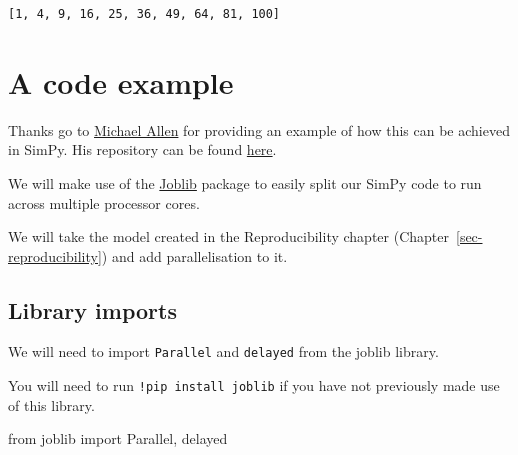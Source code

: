 \documentclass[
  letterpaper,
  DIV=11,
  numbers=noendperiod]{scrreprt}
\newenvironment{Shaded}{}{}
\newcommand{\ImportTok}[1]{\textcolor[rgb]{0.01,0.18,0.38}{#1}}
\newcommand{\NormalTok}[1]{\textcolor[rgb]{0.14,0.16,0.18}{#1}}
\begin{document}
\begin{verbatim}
[1, 4, 9, 16, 25, 36, 49, 64, 81, 100]
\end{verbatim}

\section{A code example}\label{a-code-example-2}

\begin{tcolorbox}[enhanced jigsaw, colframe=quarto-callout-note-color-frame, bottomtitle=1mm, breakable, rightrule=.15mm, coltitle=black, colbacktitle=quarto-callout-note-color!10!white, opacityback=0, leftrule=.75mm, arc=.35mm, toptitle=1mm, title=\textcolor{quarto-callout-note-color}{\faInfo}\hspace{0.5em}{Note}, titlerule=0mm, colback=white, toprule=.15mm, bottomrule=.15mm, left=2mm, opacitybacktitle=0.6]

Thanks go to \href{https://orcid.org/0000-0002-8746-9957}{Michael Allen}
for providing an example of how this can be achieved in SimPy. His
repository can be found
\href{https://github.com/MichaelAllen1966/2004_simple_simpy_parallel}{here}.

\end{tcolorbox}

We will make use of the
\href{https://joblib.readthedocs.io/en/latest/parallel.html}{Joblib}
package to easily split our SimPy code to run across multiple processor
cores.

We will take the model created in the Reproducibility chapter
(Chapter~\ref{sec-reproducibility}) and add parallelisation to it.

\subsection{Library imports}\label{library-imports}

We will need to import \texttt{Parallel} and \texttt{delayed} from the
joblib library.

You will need to run \texttt{!pip\ install\ joblib} if you have not
previously made use of this library.

\begin{Shaded}
\begin{Highlighting}[]
\ImportTok{from}\NormalTok{ joblib }\ImportTok{import}\NormalTok{ Parallel, delayed}
\end{Highlighting}
\end{Shaded}
\end{document}
